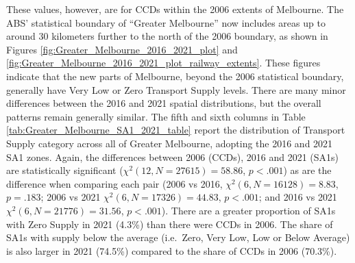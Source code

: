 \documentclass[preprint, 3p,
authoryear]{elsarticle} %
\begin{document}
These values, however, are for CCDs within the 2006 extents of
Melbourne. The ABS' statistical boundary of ``Greater Melbourne'' now
includes areas up to around 30 kilometers further to the north of the
2006 boundary, as shown in Figures
\ref{fig:Greater_Melbourne_2016_2021_plot} and
\ref{fig:Greater_Melbourne_2016_2021_plot_railway_extents}. These
figures indicate that the new parts of Melbourne, beyond the 2006
statistical boundary, generally have Very Low or Zero Transport Supply
levels. There are many minor differences between the 2016 and 2021
spatial distributions, but the overall patterns remain generally
similar. The fifth and sixth columns in Table
\ref{tab:Greater_Melbourne_SA1_2021_table} report the distribution of
Transport Supply category across all of Greater Melbourne, adopting the
2016 and 2021 SA1 zones. Again, the differences between 2006 (CCDs),
2016 and 2021 (SA1s) are statistically significant
(\(\chi^2(12, N = 27615) = 58.86\), \(p < .001\)) as are the difference
when comparing each pair (2006 vs 2016, \(\chi^2(6, N = 16128) = 8.83\),
\(p = .183\); 2006 vs 2021 \(\chi^2(6, N = 17326) = 44.83\),
\(p < .001\); and 2016 vs 2021 \(\chi^2(6, N = 21776) = 31.56\),
\(p < .001\)). There are a greater proportion of SA1s with Zero Supply
in 2021 (4.3\%) than there were CCDs in 2006. The share of SA1s with
supply below the average (i.e.~Zero, Very Low, Low or Below Average) is
also larger in 2021 (74.5\%) compared to the share of CCDs in 2006
(70.3\%).
\end{document}
